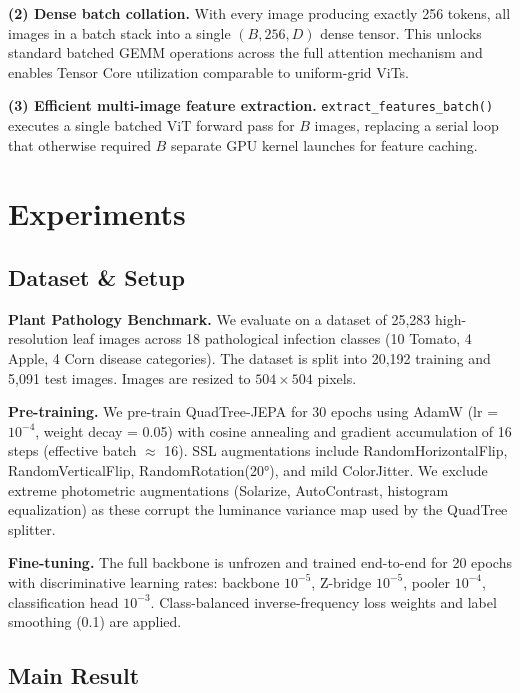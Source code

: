 \documentclass[10pt,twocolumn,letterpaper]{article}
\begin{document}
\textbf{(2) Dense batch collation.} With every image producing exactly 256 tokens, all images in a batch stack into a single $(B, 256, D)$ dense tensor. This unlocks standard batched GEMM operations across the full attention mechanism and enables Tensor Core utilization comparable to uniform-grid ViTs.

\textbf{(3) Efficient multi-image feature extraction.} \texttt{extract\_features\_batch()} executes a single batched ViT forward pass for $B$ images, replacing a serial loop that otherwise required $B$ separate GPU kernel launches for feature caching.

\section{Experiments}
\label{sec:experiments}

\subsection{Dataset \& Setup}

\textbf{Plant Pathology Benchmark.} We evaluate on a dataset of 25,283 high-resolution leaf images across 18 pathological infection classes (10 Tomato, 4 Apple, 4 Corn disease categories). The dataset is split into 20,192 training and 5,091 test images. Images are resized to $504 \times 504$ pixels.

\textbf{Pre-training.} We pre-train QuadTree-JEPA for 30 epochs using AdamW (lr = $10^{-4}$, weight decay = 0.05) with cosine annealing and gradient accumulation of 16 steps (effective batch $\approx$ 16). SSL augmentations include RandomHorizontalFlip, RandomVerticalFlip, RandomRotation(20°), and mild ColorJitter. We exclude extreme photometric augmentations (Solarize, AutoContrast, histogram equalization) as these corrupt the luminance variance map used by the QuadTree splitter.

\textbf{Fine-tuning.} The full backbone is unfrozen and trained end-to-end for 20 epochs with discriminative learning rates: backbone $10^{-5}$, Z-bridge $10^{-5}$, pooler $10^{-4}$, classification head $10^{-3}$. Class-balanced inverse-frequency loss weights and label smoothing (0.1) are applied.

\subsection{Main Result}
\end{document}
